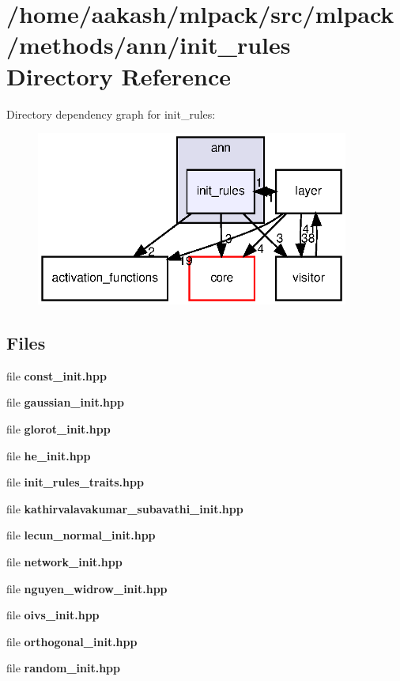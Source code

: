 \section{/home/aakash/mlpack/src/mlpack/methods/ann/init\+\_\+rules Directory Reference}
\label{dir_b52cc5b391c1a60ddf624b13b597843f}
Directory dependency graph for init\+\_\+rules\+:
\nopagebreak
\begin{figure}[H]
\begin{center}
\leavevmode
\includegraphics[width=292pt]{dir_b52cc5b391c1a60ddf624b13b597843f_dep}
\end{center}
\end{figure}
\subsection*{Files}
\begin{DoxyCompactItemize}
\item 
file \textbf{ const\+\_\+init.\+hpp}
\item 
file \textbf{ gaussian\+\_\+init.\+hpp}
\item 
file \textbf{ glorot\+\_\+init.\+hpp}
\item 
file \textbf{ he\+\_\+init.\+hpp}
\item 
file \textbf{ init\+\_\+rules\+\_\+traits.\+hpp}
\item 
file \textbf{ kathirvalavakumar\+\_\+subavathi\+\_\+init.\+hpp}
\item 
file \textbf{ lecun\+\_\+normal\+\_\+init.\+hpp}
\item 
file \textbf{ network\+\_\+init.\+hpp}
\item 
file \textbf{ nguyen\+\_\+widrow\+\_\+init.\+hpp}
\item 
file \textbf{ oivs\+\_\+init.\+hpp}
\item 
file \textbf{ orthogonal\+\_\+init.\+hpp}
\item 
file \textbf{ random\+\_\+init.\+hpp}
\end{DoxyCompactItemize}
